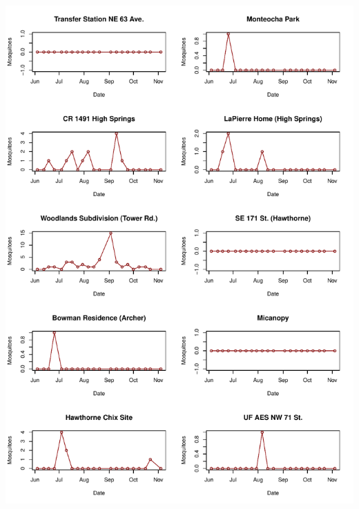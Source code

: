 \documentclass{article}
\begin{document}
\begin{center}
\includegraphics{mosq04nov13-013}

\end{center}
\end{document}
